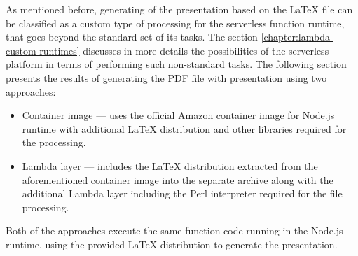 As mentioned before, generating of the presentation based on the LaTeX file can be classified as a custom type of processing for the serverless function runtime, that goes beyond the standard set of its tasks. The section \ref{chapter:lambda-custom-runtimes} discusses in more details the possibilities of the serverless platform in terms of performing such non-standard tasks. The following section presents the results of generating the PDF file with presentation using two approaches:

\begin{itemize}
   \item Container image --- uses the official Amazon container image for Node.js runtime with additional LaTeX distribution and other libraries required for the processing.
   \item Lambda layer --- includes the LaTeX distribution extracted from the aforementioned container image into the separate archive along with the additional Lambda layer including the Perl interpreter required for the file processing.
\end{itemize}

Both of the approaches execute the same function code running in the Node.js runtime, using the provided LaTeX distribution to generate the presentation.

\datasetLayerVsImage

